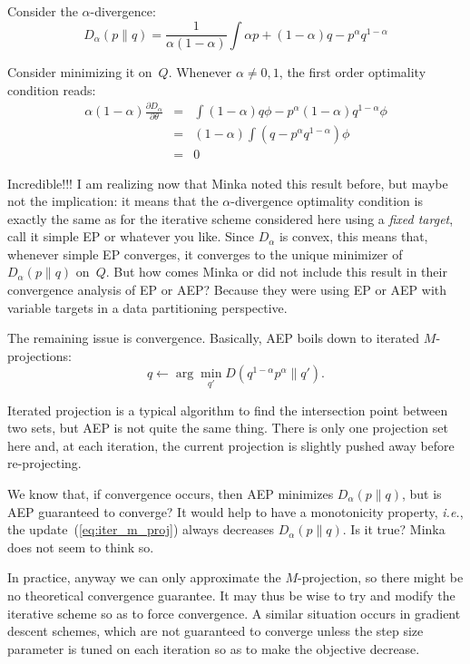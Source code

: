 \documentclass{article}
\begin{document}
Consider the $\alpha$-divergence:
$$
D_\alpha(p\|q) = 
\frac{1}{\alpha(1-\alpha)}
\int \alpha p + (1-\alpha) q - p^\alpha q^{1-\alpha} 
$$

Consider minimizing it on~$Q$. Whenever $\alpha\not=0,1$, the first order optimality condition reads:
\begin{eqnarray*}
\alpha(1-\alpha) \frac{\partial D_\alpha}{\partial \theta} 
& = & \int (1-\alpha) q \phi - p^\alpha (1-\alpha) q^{1-\alpha} \phi \\
& = & (1-\alpha) \int (q - p^\alpha q^{1-\alpha}) \phi \\
& = & 0
\end{eqnarray*}

Incredible!!! I am realizing now that Minka \cite{Minka-05} noted this result before, but maybe not the implication: it means that the $\alpha$-divergence optimality condition is exactly the same as for the iterative scheme considered here using a {\em fixed target}, call it simple EP or whatever you like.  Since $D_\alpha$ is convex, this means that, whenever simple EP converges, it converges to the unique minimizer of $D_\alpha(p\|q)$ on~$Q$.  But how comes Minka or \cite{Dehaene-18} did not include this result in their convergence analysis of EP or AEP? Because they were using EP or AEP with variable targets in a data partitioning perspective. 

The remaining issue is convergence. Basically, AEP boils down to iterated $M$-projections:
\begin{equation}
\label{eq:iter_m_proj}
q \leftarrow \arg\min_{q'} D(q^{1-\alpha}p^\alpha\|q').
\end{equation}

Iterated projection is a typical algorithm to find the intersection point between two sets, but AEP is not quite the same thing. There is only one projection set here and, at each iteration, the current projection is slightly pushed away before re-projecting. 

We know that, if convergence occurs, then AEP minimizes $D_\alpha(p\|q)$, but is AEP guaranteed to converge? It would help to have a monotonicity property, {\em i.e.}, the update~(\ref{eq:iter_m_proj}) always decreases $D_\alpha(p\|q)$. Is it true? Minka \cite{Minka-05} does not seem to think so.

In practice, anyway we can only approximate the $M$-projection, so there might be no theoretical convergence guarantee. It may thus be wise to try and modify the iterative scheme so as to force convergence. A similar situation occurs in gradient descent schemes, which are not guaranteed to converge unless the step size parameter is tuned on each iteration so as to make the objective decrease.
\end{document}

